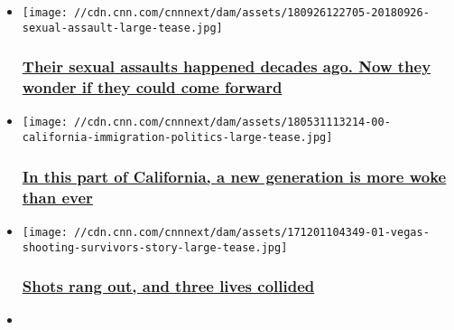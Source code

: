 \begin{itemize}
\item
  \href{/2018/09/26/health/sexual-assault-reporting-kavanaugh/index.html}{}

  \texttt{[image: //cdn.cnn.com/cnnnext/dam/assets/180926122705-20180926-sexual-assault-large-tease.jpg]}

  \hypertarget{their-sexual-assaults-happened-decades-ago-now-they-wonder-if-they-could-come-forward}{%
  \subsubsection{\texorpdfstring{\href{/2018/09/26/health/sexual-assault-reporting-kavanaugh/index.html}{Their
  sexual assaults happened decades ago. Now they wonder if they could
  come
  forward}}{Their sexual assaults happened decades ago. Now they wonder if they could come forward}}\label{their-sexual-assaults-happened-decades-ago-now-they-wonder-if-they-could-come-forward}}
\item
  \href{/2018/06/01/us/how-immigrants-changed-california-politics/index.html}{}

  \texttt{[image: //cdn.cnn.com/cnnnext/dam/assets/180531113214-00-california-immigration-politics-large-tease.jpg]}

  \hypertarget{in-this-part-of-california-a-new-generation-is-more-woke-than-ever}{%
  \subsubsection{\texorpdfstring{\href{/2018/06/01/us/how-immigrants-changed-california-politics/index.html}{In
  this part of California, a new generation is more woke than
  ever}}{In this part of California, a new generation is more woke than ever}}\label{in-this-part-of-california-a-new-generation-is-more-woke-than-ever}}
\item
  \href{/2018/01/10/health/vegas-shooting-survivor-rachel-sheppard/index.html}{}

  \texttt{[image: //cdn.cnn.com/cnnnext/dam/assets/171201104349-01-vegas-shooting-survivors-story-large-tease.jpg]}

  \hypertarget{shots-rang-out-and-three-lives-collided}{%
  \subsubsection{\texorpdfstring{\href{/2018/01/10/health/vegas-shooting-survivor-rachel-sheppard/index.html}{Shots
  rang out, and three lives
  collided}}{Shots rang out, and three lives collided}}\label{shots-rang-out-and-three-lives-collided}}
\item
  \href{/2017/12/13/health/kentucky-appalachia-women-eprise/index.html}{}


\end{itemize}
